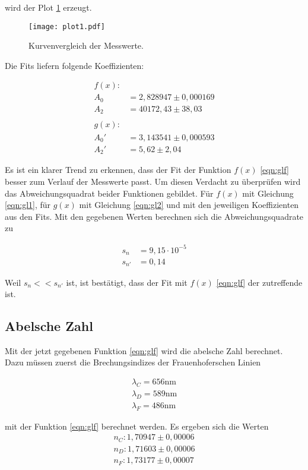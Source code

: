 wird der Plot \ref{fig:plot1} erzeugt.

\begin{figure}
  \centering
  \texttt{[image: plot1.pdf]}
  \caption{Kurvenvergleich der Messwerte.}
  \label{fig:plot1}
\end{figure}
\FloatBarrier

Die Fits liefern folgende Koeffizienten:

\begin{align*}
  f(x): \\
  A_0 &= 2,828947 \pm 0,000169 \\
  A_2 &= 40172,43 \pm 38,03 \\
  \\
  g(x): \\
  A_0' &= 3,143541 \pm 0,000593 \\
  A_2' &= 5,62 \pm 2,04 
\end{align*}

Es ist ein klarer Trend zu erkennen, dass der Fit der Funktion $f(x)$ \eqref{eqn:glf} besser zum Verlauf der Messwerte passt.
Um diesen Verdacht zu überprüfen wird das Abweichungsquadrat beider Funktionen gebildet.
Für $f(x)$ mit Gleichung \eqref{eqn:gl1}, für $g(x)$ mit Gleichung \eqref{eqn:gl2} und mit den jeweiligen Koeffizienten aus den Fits.
Mit den gegebenen Werten berechnen sich die Abweichungsquadrate zu

\begin{align*}
  s_{n} &= 9,15 \cdot 10^{-5} \\
  s_{n'} &= 0,14
\end{align*}

Weil $s_n << s_{n'}$ ist, ist bestätigt, dass der Fit mit $f(x)$ \eqref{eqn:glf} der zutreffende ist.

\subsection{Abelsche Zahl}

Mit der jetzt gegebenen Funktion \eqref{eqn:glf} wird die abelsche Zahl berechnet.
Dazu müssen zuerst die Brechungsindizes der Frauenhoferschen Linien

\begin{align*}
  \lambda_C = 656 \text{nm} \\
  \lambda_D = 589 \text{nm} \\
  \lambda_F = 486 \text{nm}
\end{align*}

mit der Funktion \eqref{eqn:glf} berechnet werden.
Es ergeben sich die Werten
\begin{align*}
  n_C:  1,70947 \pm 0,00006 \\
  n_D:  1,71603 \pm 0,00006 \\
  n_F:  1,73177 \pm 0,00007
\end{align*}

